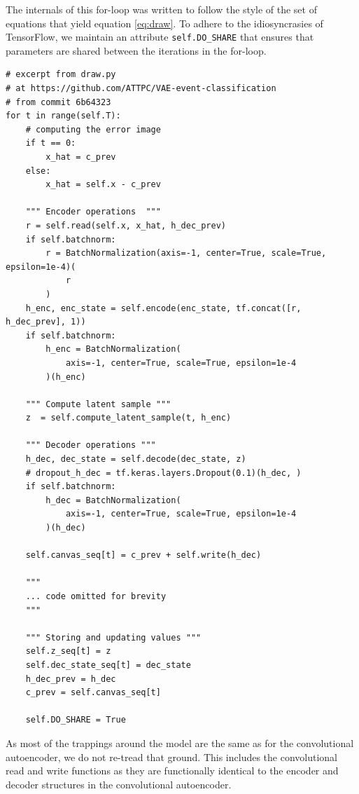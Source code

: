The internals of this for-loop was written to follow the style of the set of equations that yield equation \ref{eq:draw}. To adhere to the idiosyncrasies of TensorFlow, we maintain an attribute \lstinline{self.DO_SHARE} that ensures that parameters are shared between the iterations in the for-loop.

\begin{minipage}{\linewidth}
\begin{lstlisting}[language=iPython]
# excerpt from draw.py
# at https://github.com/ATTPC/VAE-event-classification
# from commit 6b64323
for t in range(self.T):
	# computing the error image
	if t == 0:
	    x_hat = c_prev
	else:
	    x_hat = self.x - c_prev

	""" Encoder operations  """
	r = self.read(self.x, x_hat, h_dec_prev)
	if self.batchnorm:
	    r = BatchNormalization(axis=-1, center=True, scale=True, epsilon=1e-4)(
	        r
	    )
	h_enc, enc_state = self.encode(enc_state, tf.concat([r, h_dec_prev], 1))
	if self.batchnorm:
	    h_enc = BatchNormalization(
	        axis=-1, center=True, scale=True, epsilon=1e-4
	    )(h_enc)

	""" Compute latent sample """
	z  = self.compute_latent_sample(t, h_enc)

	""" Decoder operations """
	h_dec, dec_state = self.decode(dec_state, z)
	# dropout_h_dec = tf.keras.layers.Dropout(0.1)(h_dec, )
	if self.batchnorm:
	    h_dec = BatchNormalization(
	        axis=-1, center=True, scale=True, epsilon=1e-4
	    )(h_dec)

	self.canvas_seq[t] = c_prev + self.write(h_dec)

	"""
	... code omitted for brevity
	"""

	""" Storing and updating values """
	self.z_seq[t] = z
	self.dec_state_seq[t] = dec_state
	h_dec_prev = h_dec
	c_prev = self.canvas_seq[t]

	self.DO_SHARE = True
\end{lstlisting}
\end{minipage}

As most of the trappings around the model are the same as for the convolutional autoencoder, we do not re-tread that ground. This includes the convolutional read and write functions as they are functionally identical to the encoder and decoder structures in the convolutional autoencoder. 

